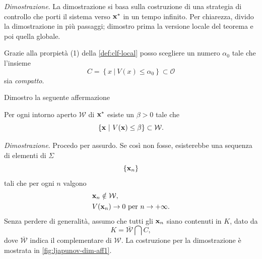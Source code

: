 \emph{Dimostrazione}.
La dimostrazione si basa sulla costruzione di una strategia di
controllo che porti il sistema verso $\mathbf{x}^*$ in un tempo infinito.
Per chiarezza, divido la dimostrazione in più passaggi; dimostro prima la versione locale
del teorema e poi quella globale.
\begin{steps}
    \item Grazie alla prorpietà (1) della \autoref{def:clf-local}
    posso scegliere un numero $\alpha_0$ tale che l'insieme
    \begin{equation}
        C = \left\{ x\ |\ V(x) \leq \alpha_0 \right\} \subset \mathcal O
        \label{eq:alpha_0}
    \end{equation}
    sia \emph{compatto}.

    Dimostro la seguente affermazione

    \begin{aff}
        Per ogni intorno aperto $\mathcal W$ di $\mathbf{x}^*$ esiste
        un $\beta > 0$ tale che
        \begin{equation*}
            \{\mathbf{x}\ |\ V(\mathbf{x}) \leq \beta\} \subset \mathcal W.
        \end{equation*}
    \end{aff}

    \emph{Dimostrazione}.
    Procedo per assurdo.
    Se così non fosse, esisterebbe una sequenza di elementi di $\Sigma$
    \begin{equation*}
    \{\mathbf{x}_n\}
    \end{equation*}
    tali che per ogni $n$
    valgono
    \begin{align*}
        &\mathbf{x}_n \notin \mathcal W, \\
        &V(\mathbf{x}_n) \to 0 \text{ per } n \to +\infty.
    \end{align*}
    Senza perdere di generalità, assumo che tutti gli $\mathbf{x}_n$
    siano contenuti in $K$, dato da
    \begin{equation*}
        K = \bar{\mathcal W} \bigcap C,
    \end{equation*}
    dove $\bar{\mathcal W}$ indica il complementare di $\mathcal W$.
    La costruzione per la dimostrazione è mostrata in \autoref{fig:ljapunov-dim-aff1}.


\end{steps}
